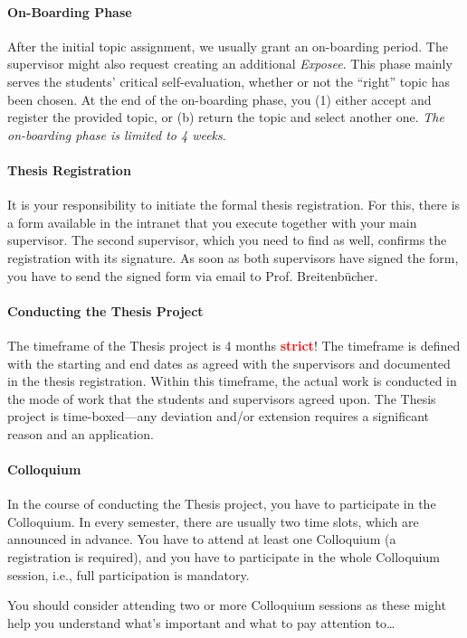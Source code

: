 \paragraph*{On-Boarding Phase}
After the initial topic assignment, we usually grant an on-boarding period. The supervisor might also request creating an additional \emph{Exposee}. This phase mainly serves the students' critical self-evaluation, whether or not the ``right'' topic has been chosen. At the end of the on-boarding phase, you (1) either accept and register the provided topic, or (b) return the topic and select another one. \emph{The on-boarding phase is limited to 4 weeks}.

\paragraph*{Thesis Registration}
It is your responsibility to initiate the formal thesis registration. For this, there is a form available in the intranet that you execute together with your main supervisor. The second supervisor, which you need to find as well, confirms the registration with its signature. As soon as both supervisors have signed the form, you have to send the signed form via email to Prof. Breitenb\"ucher. 

\paragraph*{Conducting the Thesis Project}
The timeframe of the Thesis project is 4 months \textcolor{red}{\textbf{strict}}! The timeframe is defined with the starting and end dates as agreed with the supervisors and documented in the thesis registration. Within this timeframe, the actual work is conducted in the mode of work that the students and supervisors agreed upon. The Thesis project is time-boxed---any deviation and/or extension requires a significant reason and an application.

\paragraph*{Colloquium}
In the course of conducting the Thesis project, you have to participate in the Colloquium. In every semester, there are usually two time slots, which are announced in advance. You have to attend at least one Colloquium (a registration is required), and you have to participate in the whole Colloquium session, i.e., full participation is mandatory.

\begin{MySugg}
	You should consider attending two or more Colloquium sessions as these might help you understand what's important and what to pay attention to\ldots
\end{MySugg}

